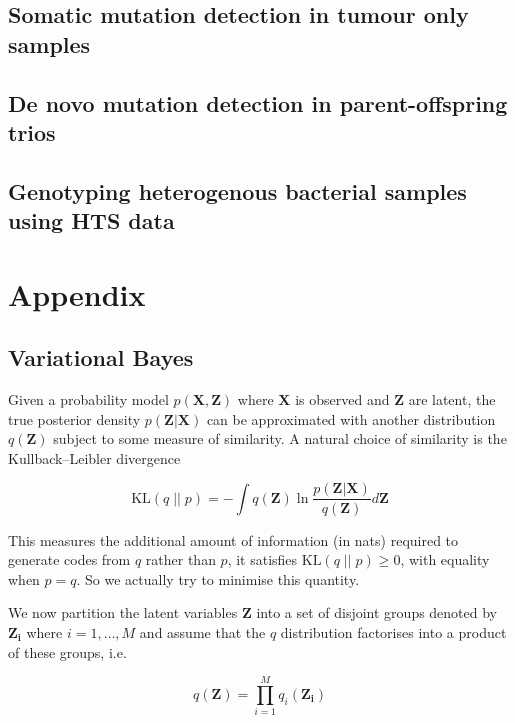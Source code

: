 \documentclass{article}
\begin{document}
\subsection{Somatic mutation detection in tumour only samples}

\subsection{De novo mutation detection in parent-offspring trios}

\subsection{Genotyping heterogenous bacterial samples using HTS data}

\section{Appendix}

\subsection{Variational Bayes}

Given a probability model $p(\boldsymbol{X}, \boldsymbol{Z})$ where $\boldsymbol{X}$ is observed and $\boldsymbol{Z}$ are latent, the true posterior density $p(\boldsymbol{Z} | \boldsymbol{X})$ can be approximated with another distribution $q(\boldsymbol{Z})$ subject to some measure of similarity. A natural choice of similarity is the Kullback–Leibler divergence

\begin{equation}
\label{eq:kl}
   \text{KL} (q\; ||\; p) = -\int q(\boldsymbol{Z}) \ln \frac{p(\boldsymbol{Z} | \boldsymbol{X})}{q(\boldsymbol{Z})} d\boldsymbol{Z}
\end{equation}

This measures the additional amount of information (in nats) required to generate codes from $q$ rather than $p$, it satisfies $\text{KL}(q\; ||\; p) \ge 0$, with equality when $p = q$. So we actually try to minimise this quantity.

We now partition the latent variables $\boldsymbol{Z}$ into a set of disjoint groups denoted by $\boldsymbol{Z_i}$ where $i = 1, \dots, M$ and assume that the $q$ distribution factorises into a product of these groups, i.e.

\begin{equation}
\label{eq:q}
  q(\boldsymbol{Z}) = \prod_{i = 1}^M q_i(\boldsymbol{Z_i})
\end{equation}
\end{document}
